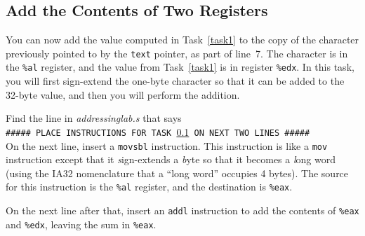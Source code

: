 %
%
%
%

\subsection{Add the Contents of Two Registers}\label{task3}

You can now add the value computed in Task~\ref{task1} to the copy of the
character previously pointed to by the \lstinline{text} pointer, as part of
line~7. The character is in the \lstinline{%al} register, and the value from
Task~\ref{task1} is in register \lstinline{%edx}. In this task, you will first
sign-extend the one-byte character so that it can be added to the 32-byte
value, and then you will perform the addition.

Find the line in \textit{addressinglab.s} that says \\
\texttt{\#\#\#\#\# PLACE INSTRUCTIONS FOR TASK \ref{task3} ON NEXT TWO LINES \#\#\#\#\#} \\
On the next line, insert a \lstinline{movsbl} instruction. This instruction is
like a \lstinline{mov} instruction except that it \textit{s}ign-extends a
\textit{b}yte so that it becomes a \textit{l}ong word (using the IA32
nomenclature that a ``long word'' occupies 4 bytes). The source for this
instruction is the \lstinline{%al} register, and the destination is
\lstinline{%eax}.

On the next line after that, insert an \lstinline{addl} instruction to add the
contents of \lstinline{%eax} and \lstinline{%edx}, leaving the sum in
\lstinline{%eax}.

